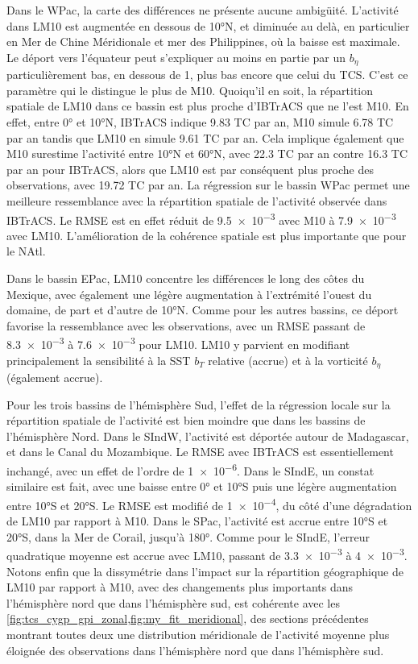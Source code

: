 \documentclass[../main.tex]{subfiles}
\begin{document}
Dans le WPac, la carte des différences ne présente aucune ambigüité. L'activité dans LM10 est augmentée en dessous de \ang{10}N, et diminuée au delà, en
particulier en Mer de Chine Méridionale et mer des Philippines, où la baisse est maximale. Le déport vers l'équateur peut s'expliquer au moins en partie par un
$b_\eta$ particulièrement bas, en dessous de \num{1}, plus bas encore que celui du TCS. C'est ce paramètre qui le distingue le plus de M10. Quoiqu'il en soit,
la répartition spatiale de LM10 dans ce bassin est plus proche d'IBTrACS que ne l'est M10. En effet, entre \ang{0} et \ang{10}N, IBTrACS indique \num{9.83} TC
par an, M10 simule \num{6.78} TC par an tandis que LM10 en simule \num{9.61} TC par an. Cela implique également que M10 surestime l'activité entre \ang{10}N et
\ang{60}N, avec \num{22.3} TC par an contre \num{16.3} TC par an pour IBTrACS, alors que LM10 est par conséquent plus proche des observations, avec \num{19.72}
TC par an. La régression sur le bassin WPac permet une meilleure ressemblance avec la répartition spatiale de l'activité observée dans IBTrACS. Le RMSE est en
effet réduit de \num{9.5e-3} avec M10 à \num{7.9e-3} avec LM10. L'amélioration de la cohérence spatiale est plus importante que pour le NAtl.

Dans le bassin EPac, LM10 concentre les différences le long des côtes du Mexique, avec également une légère augmentation à l'extrémité l'ouest du domaine, de
part et d'autre de \ang{10}N. Comme pour les autres bassins, ce déport favorise la ressemblance avec les observations, avec un RMSE passant de \num{8.3e-3} à
\num{7.6e-3} pour LM10. LM10 y parvient en modifiant principalement la sensibilité à la SST $b_T$ relative (accrue) et à la vorticité $b_\eta$ (également
accrue).

Pour les trois bassins de l'hémisphère Sud, l'effet de la régression locale sur la répartition spatiale de l'activité est bien moindre que dans les bassins de
l'hémisphère Nord. Dans le SIndW, l'activité est déportée autour de Madagascar, et dans le Canal du Mozambique. Le RMSE avec IBTrACS est essentiellement
inchangé, avec un effet de l'ordre de \num{1e-6}. Dans le SIndE, un constat similaire est fait, avec une baisse entre \ang{0} et \ang{10}S puis une légère
augmentation entre \ang{10}S et \ang{20}S. Le RMSE est modifié de \num{1e-4}, du côté d'une dégradation de LM10 par rapport à M10. Dans le SPac, l'activité est
accrue entre \ang{10}S et \ang{20}S, dans la Mer de Corail, jusqu'à \ang{180}. Comme pour le SIndE, l'erreur quadratique moyenne est accrue avec LM10, passant
de \num{3.3e-3} à \num{4e-3}. Notons enfin que la dissymétrie dans l'impact sur la répartition géographique de LM10 par rapport à M10, avec des changements plus
importants dans l'hémisphère nord que dans l'hémisphère sud, est cohérente avec les \cref{fig:tcs_cygp_gpi_zonal,fig:my_fit_meridional}, des sections
précédentes montrant toutes deux une distribution méridionale de l'activité moyenne plus éloignée des observations dans l'hémisphère nord que dans l'hémisphère
sud.
\end{document}
